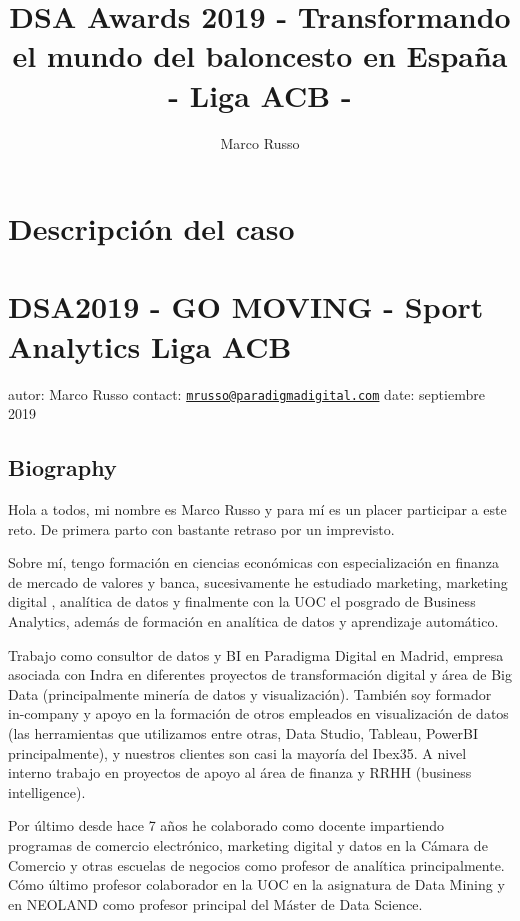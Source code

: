 \documentclass[]{article}
\title{DSA Awards 2019 - Transformando el mundo del baloncesto en España - Liga
ACB -}
\author{Marco Russo}
\date{}
\begin{document}
\maketitle

{
\setcounter{tocdepth}{2}
\tableofcontents
}
\section{Descripción del caso}\label{descripcion-del-caso}

\section{DSA2019 - GO MOVING - Sport Analytics Liga
ACB}\label{dsa2019---go-moving---sport-analytics-liga-acb}

autor: Marco Russo contact:
\href{mailto:mrusso@paradigmadigital.com}{\nolinkurl{mrusso@paradigmadigital.com}}
date: septiembre 2019

\subsection{Biography}\label{biography}

Hola a todos, mi nombre es Marco Russo y para mí es un placer participar
a este reto. De primera parto con bastante retraso por un imprevisto.

Sobre mí, tengo formación en ciencias económicas con especialización en
finanza de mercado de valores y banca, sucesivamente he estudiado
marketing, marketing digital , analítica de datos y finalmente con la
UOC el posgrado de Business Analytics, además de formación en analítica
de datos y aprendizaje automático.

Trabajo como consultor de datos y BI en Paradigma Digital en Madrid,
empresa asociada con Indra en diferentes proyectos de transformación
digital y área de Big Data (principalmente minería de datos y
visualización). También soy formador in-company y apoyo en la formación
de otros empleados en visualización de datos (las herramientas que
utilizamos entre otras, Data Studio, Tableau, PowerBI principalmente), y
nuestros clientes son casi la mayoría del Ibex35. A nivel interno
trabajo en proyectos de apoyo al área de finanza y RRHH (business
intelligence).

Por último desde hace 7 años he colaborado como docente impartiendo
programas de comercio electrónico, marketing digital y datos en la
Cámara de Comercio y otras escuelas de negocios como profesor de
analítica principalmente. Cómo último profesor colaborador en la UOC en
la asignatura de Data Mining y en NEOLAND como profesor principal del
Máster de Data Science.
\end{document}
